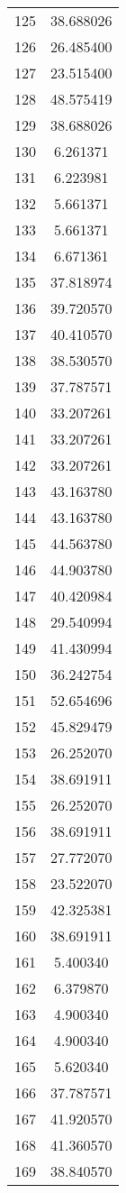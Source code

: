 \documentclass[12pt]{article}
\begin{document}
\begin{longtable}{@{}cc@{}}
125 & 38.688026 \\
126 & 26.485400 \\
127 & 23.515400 \\
128 & 48.575419 \\
129 & 38.688026 \\
130 & 6.261371 \\
131 & 6.223981 \\
132 & 5.661371 \\
133 & 5.661371 \\
134 & 6.671361 \\
135 & 37.818974 \\
136 & 39.720570 \\
137 & 40.410570 \\
138 & 38.530570 \\
139 & 37.787571 \\
140 & 33.207261 \\
141 & 33.207261 \\
142 & 33.207261 \\
143 & 43.163780 \\
144 & 43.163780 \\
145 & 44.563780 \\
146 & 44.903780 \\
147 & 40.420984 \\
148 & 29.540994 \\
149 & 41.430994 \\
150 & 36.242754 \\
151 & 52.654696 \\
152 & 45.829479 \\
153 & 26.252070 \\
154 & 38.691911 \\
155 & 26.252070 \\
156 & 38.691911 \\
157 & 27.772070 \\
158 & 23.522070 \\
159 & 42.325381 \\
160 & 38.691911 \\
161 & 5.400340 \\
162 & 6.379870 \\
163 & 4.900340 \\
164 & 4.900340 \\
165 & 5.620340 \\
166 & 37.787571 \\
167 & 41.920570 \\
168 & 41.360570 \\
169 & 38.840570 \\

\end{longtable}
\end{document}
